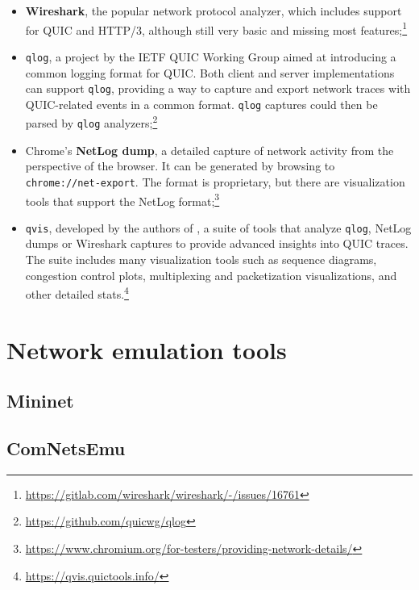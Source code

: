\begin{itemize}
    \item \textbf{Wireshark}, the popular network protocol analyzer, which includes support for QUIC and HTTP/3, although still very basic and missing most features;\footnote{\url{https://gitlab.com/wireshark/wireshark/-/issues/16761}}
    \item \texttt{qlog}, a project by the IETF QUIC Working Group aimed at introducing a common logging format for QUIC. Both client and server implementations can support \texttt{qlog}, providing a way to capture and export network traces with QUIC-related events in a common format. \texttt{qlog} captures could then be parsed by \texttt{qlog} analyzers;\footnote{\url{https://github.com/quicwg/qlog}}
    \item Chrome's \textbf{NetLog dump}, a detailed capture of network activity from the perspective of the browser. It can be generated by browsing to \texttt{chrome://net-export}. The format is proprietary, but there are visualization tools that support the NetLog format;\footnote{\url{https://www.chromium.org/for-testers/providing-network-details/}}
    \item \texttt{qvis}, developed by the authors of \cite{quicdiversity}, a suite of tools that analyze \texttt{qlog}, NetLog dumps or Wireshark captures to provide advanced insights into QUIC traces. The suite includes many visualization tools such as sequence diagrams, congestion control plots, multiplexing and packetization visualizations, and other detailed stats.\footnote{\url{https://qvis.quictools.info/}}
\end{itemize}

\section{Network emulation tools}
\label{sec:bg/network}


\subsection{Mininet}
\label{sec:bg/network/mininet}


\subsection{ComNetsEmu}
\label{sec:bg/network/comnetsemu}

